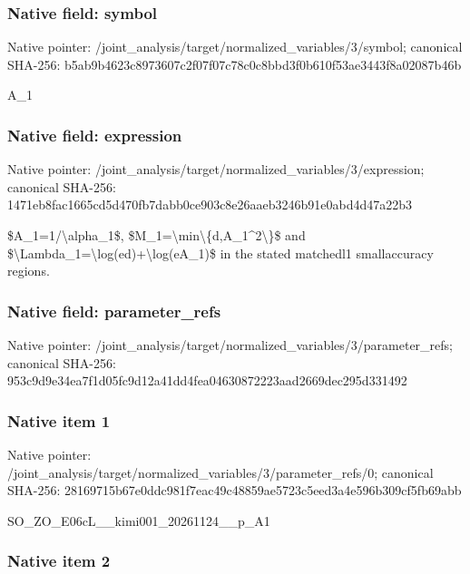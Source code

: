 \documentclass[10pt,a4paper]{article}
\begin{document}
\subsubsection{Native field: symbol}


Native pointer: /joint\_analysis/target/n\allowbreak{}ormalized\_variables/3/sy\allowbreak{}mbol; canonical SHA-256: b5ab9b4623c8973607c2f07f\allowbreak{}07c78c0c8bbd3f0b610f53ae\allowbreak{}3443f8a02087b46b


A\_1


\subsubsection{Native field: expression}


Native pointer: /joint\_analysis/target/n\allowbreak{}ormalized\_variables/3/ex\allowbreak{}pression; canonical SHA-256: 1471eb8fac1665cd5d470fb7\allowbreak{}dabb0ce903c8e26aaeb3246b\allowbreak{}91e0abd4d47a22b3


\$A\_1=1/\textbackslash{}alpha\_1\$, \$M\_1=\textbackslash{}min\textbackslash{}\{d,A\_1\textasciicircum{}2\textbackslash{}\}\$ and \$\textbackslash{}Lambda\_1=\textbackslash{}log(ed)+\textbackslash{}log(eA\_1)\$ in the stated matchedl1 smallaccuracy regions.


\subsubsection{Native field: parameter\_refs}


Native pointer: /joint\_analysis/target/n\allowbreak{}ormalized\_variables/3/pa\allowbreak{}rameter\_refs; canonical SHA-256: 953c9d9e34ea7f1d05fc9d12\allowbreak{}a41dd4fea04630872223aad2\allowbreak{}669dec295d331492



\subsubsection{Native item 1}


Native pointer: /joint\_analysis/target/n\allowbreak{}ormalized\_variables/3/pa\allowbreak{}rameter\_refs/0; canonical SHA-256: 28169715b67e0ddc981f7eac\allowbreak{}49c48859ae5723c5eed3a4e5\allowbreak{}96b309cf5fb69abb


SO\_ZO\_E06cL\_\_kimi001\_20261124\_\_p\_A1


\subsubsection{Native item 2}
\end{document}
